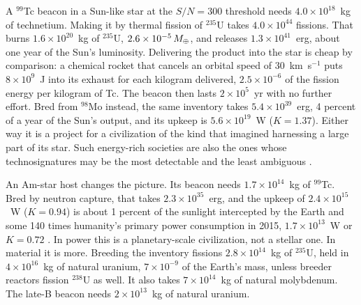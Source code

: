 \documentclass[final,5p]{elsarticle}
\begin{document}
\begin{table}
\centering
\caption{Beacons of $^{99}$Tc bred from $^{98}$Mo, at $S/N = 300$ with the instruments listed: photospheric beacons (Section~\ref{sec:results}) and gas in front of the star (Section~\ref{sec:gas}). ``Sky'' is the fraction of the sky from which the beacon is seen; for a comet, the fraction from which it transits while it releases its dopant, near the plane of its orbit. Mass: the inventory of a photospheric beacon, and the dopant per event of a gas beacon. $K$ is the Sagan type of the upkeep of a photospheric beacon, and of the power that gives a monitoring program an even chance of catching a gas beacon in 10~yr, with 530 spectra a year from the ground or 20 from space.}
\label{tab:beacons}
\footnotesize

\end{table}

A $^{99}$Tc beacon in a Sun-like star at the $S/N = 300$ threshold needs $4.0\times10^{18}$~kg of technetium. Making it by thermal fission of $^{235}$U takes $4.0\times10^{44}$ fissions. That burns $1.6\times10^{20}$~kg of $^{235}$U, $2.6\times10^{-5}\,M_\oplus$, and releases $1.3\times10^{41}$~erg, about one year of the Sun's luminosity. Delivering the product into the star is cheap by comparison: a chemical rocket that cancels an orbital speed of 30~km~s$^{-1}$ puts $8\times10^{9}$~J into its exhaust for each kilogram delivered, $2.5\times10^{-6}$ of the fission energy per kilogram of Tc. The beacon then lasts $2\times10^{5}$~yr with no further effort. Bred from $^{98}$Mo instead, the same inventory takes $5.4\times10^{39}$~erg, 4 percent of a year of the Sun's output, and its upkeep is $5.6\times10^{19}$~W ($K = 1.37$). Either way it is a project for a civilization of the kind that \citet{Kardashev1964} imagined harnessing a large part of its star. Such energy-rich societies are also the ones whose technosignatures may be the most detectable and the least ambiguous \citep{Wright2022case}.

An Am-star host changes the picture. Its  beacon needs $1.7\times10^{14}$~kg of $^{99}$Tc. Bred by neutron capture, that takes $2.3\times10^{35}$~erg, and the upkeep of $2.4\times10^{15}$~W ($K = 0.94$) is about 1 percent of the sunlight intercepted by the Earth and some 140 times humanity's primary power consumption in 2015, $1.7\times10^{13}$~W or $K = 0.72$ \citep{Gray2020}. In power this is a planetary-scale civilization, not a stellar one. In material it is more. Breeding the inventory fissions $2.8\times10^{14}$~kg of $^{235}$U, held in $4\times10^{16}$~kg of natural uranium, $7\times10^{-9}$ of the Earth's mass, unless breeder reactors fission $^{238}$U as well. It also takes $7\times10^{14}$~kg of natural molybdenum. The late-B beacon needs $2\times10^{13}$~kg of natural uranium.
\end{document}
